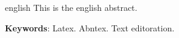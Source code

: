 \begin{resumo}[Abstract]
    \begin{otherlanguage*}{english}
      This is the english abstract.
   
      \vspace{\onelineskip}
    
      \noindent 
      \textbf{Keywords}: Latex. Abntex. Text editoration.
    \end{otherlanguage*}
\end{resumo}